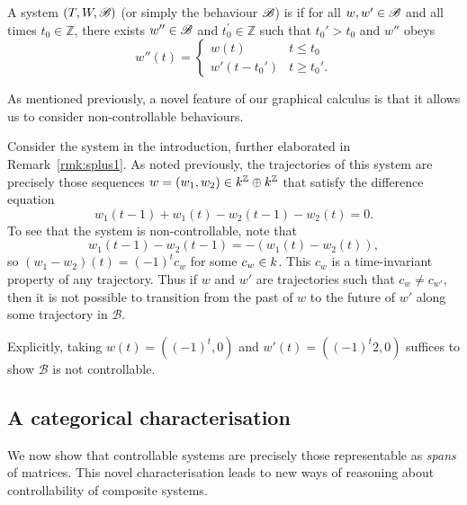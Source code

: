 \begin{definition}\label{def:contr}
A system $(T,W,{\mathscr B})$ (or simply the behaviour ${\mathscr B}$) is  if
for all $w,w' \in {\mathscr B}$ and all times $t_0\in\mathbb{Z}$, there exists $w'' \in
{\mathscr B}$ and $t_0^\prime\in\mathbb{Z}$ such that $t_0'>t_0$ and $w''$ obeys
\[
  w''(t) = 
  \begin{cases} 
    w(t) & t \le t_0 \\
    w'(t-t_0') & t \ge t_0'.
  \end{cases}
\]
\end{definition}

As mentioned previously, a novel feature of our graphical calculus is
that it allows us to consider non-controllable behaviours.

\begin{example} \label{ex.noncontrol}
Consider the system in the introduction, further elaborated in Remark~\ref{rmk:splus1}.
%
As noted previously,
the trajectories of this system are
precisely those sequences $w= (w_1, w_2) \in k^{\mathbb Z} \oplus k^{\mathbb Z}$ that satisfy
the difference equation
\[
  w_1(t-1)+w_1(t)-w_2(t-1)-w_2(t)=0.
\]
To see that the system is non-controllable, note that
\[
  w_1(t-1)-w_2(t-1) = -(w_1(t)-w_2(t)),
\]
so $(w_1-w_2)(t) = (-1)^tc_w$ for some $c_w \in k$. This $c_w$ is a time-invariant
property of any trajectory. Thus if $w$ and $w'$ are trajectories such that $c_w \ne
c_{w'}$, then it is not possible to transition from the past of $w$ to the
future of $w'$ along some trajectory in $\mathcal B$. 

Explicitly, taking $w(t) = ((-1)^t,0)$ and $w'(t) = ((-1)^t2,0)$ suffices to
show $\mathcal B$ is not controllable.
\end{example}

\subsection{A categorical characterisation}
We now show that controllable systems are precisely those representable as
\emph{spans} of matrices. This novel characterisation leads to new ways of
reasoning about controllability of composite systems. 

